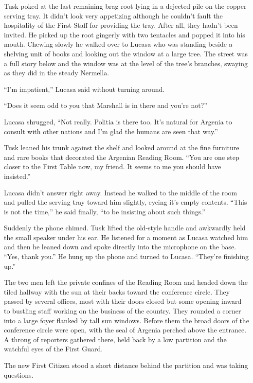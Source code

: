 
Tusk poked at the last remaining brag root lying in a dejected pile on the copper serving tray.
It didn't look very appetizing although he couldn't fault the hospitality of the First Staff for
providing the tray. After all, they hadn't been invited. He picked up the root gingerly with two
tentacles and popped it into his mouth. Chewing slowly he walked over to Lucasa who was standing
beside a shelving unit of books and looking out the window at a large tree. The street was a
full story below and the window was at the level of the tree's branches, swaying as they did in
the steady Nermella.

``I'm impatient,'' Lucasa said without turning around.

``Does it seem odd to you that Marshall is in there and you're not?''

Lucasa shrugged, ``Not really. Politia is there too. It's natural for Argenia to consult with
other nations and I'm glad the humans are seen that way.''

Tusk leaned his trunk against the shelf and looked around at the fine furniture and rare books
that decorated the Argenian Reading Room. ``You are one step closer to the First Table now, my
friend. It seems to me you should have insisted.''

Lucasa didn't answer right away. Instead he walked to the middle of the room and pulled the
serving tray toward him slightly, eyeing it's empty contents. ``This is not the time,'' he said
finally, ``to be insisting about such things.''

Suddenly the phone chimed. Tusk lifted the old-style handle and awkwardly held the small speaker
under his ear. He listened for a moment as Lucasa watched him and then he leaned down and spoke
directly into the microphone on the base. ``Yes, thank you.'' He hung up the phone and turned to
Lucasa. ``They're finishing up.''

The two men left the private confines of the Reading Room and headed down the tiled hallway with
the sun at their backs toward the conference circle. They passed by several offices, most with
their doors closed but some opening inward to bustling staff working on the business of the
country. They rounded a corner into a large foyer flanked by tall sun windows. Before them the
broad doors of the conference circle were open, with the seal of Argenia perched above the
entrance. A throng of reporters gathered there, held back by a low partition and the watchful
eyes of the First Guard.

The new First Citizen stood a short distance behind the partition and was taking questions.

